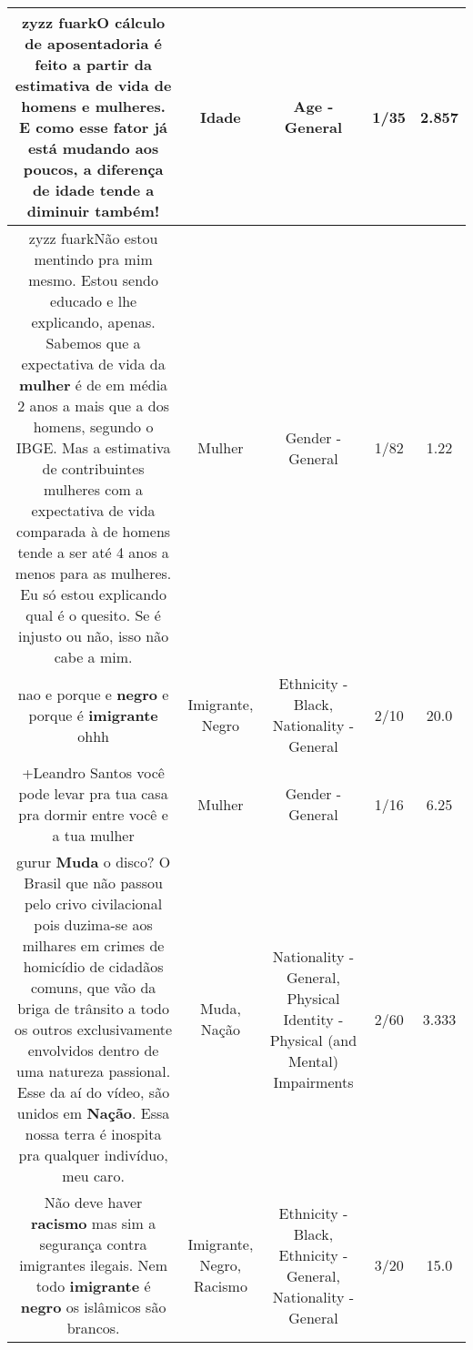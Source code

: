 \documentclass[11pt]{article}
\newlength\mylength
\begin{document}
\begin{center}
\begin{longtable}{|C{.65\mylength}|C{.30\mylength}|C{.12\mylength}|C{.12\mylength}|C{.12\mylength}|}
  \small zyzz fuarkO cálculo de aposentadoria é feito a partir da estimativa de vida de homens e mulheres. E como esse fator já está mudando aos poucos, a diferença de \textbf{idade} tende a diminuir também!\normalsize   & Idade & Age - General & 1/35 & 2.857 \\  \hline
  \small zyzz fuarkNão estou mentindo pra mim mesmo. Estou sendo educado e lhe explicando, apenas. Sabemos que a expectativa de vida da \textbf{mulher} é de em média 2 anos a mais que a dos homens, segundo o IBGE. Mas a estimativa de contribuintes mulheres com a expectativa de vida comparada à de homens tende a ser até 4 anos a menos para as mulheres. Eu só estou explicando qual é o quesito. Se é injusto ou não, isso não cabe a mim.\normalsize   & Mulher & Gender - General & 1/82 & 1.22 \\  \hline
  \small nao e porque e \textbf{negro} e porque é \textbf{imigrante} ohhh\normalsize   & Imigrante, Negro & Ethnicity - Black, Nationality - General & 2/10 & 20.0 \\  \hline
  \small +Leandro Santos você pode levar pra tua casa pra dormir entre você e a tua mulher\normalsize   & Mulher & Gender - General & 1/16 & 6.25 \\  \hline
  \small {} gurur​ \textbf{Muda} o disco? O Brasil que não passou pelo crivo civilacional pois duzima-se aos milhares em crimes de homicídio de cidadãos comuns, que vão da briga de trânsito a todo os outros exclusivamente envolvidos dentro de uma natureza passional. Esse da aí do vídeo,  são unidos em \textbf{Nação}. Essa nossa terra é inospita pra qualquer indivíduo, meu caro.\normalsize   & Muda, Nação & Nationality - General, Physical Identity - Physical (and Mental) Impairments & 2/60 & 3.333 \\  \hline
  \small Não  deve haver \textbf{racismo}  mas sim a segurança  contra  imigrantes  ilegais. Nem todo \textbf{imigrante}  é  \textbf{negro} os islâmicos  são  brancos.\normalsize   & Imigrante, Negro, Racismo & Ethnicity - Black, Ethnicity - General, Nationality - General & 3/20 & 15.0 \\  \hline

\end{longtable}
\end{center}
\end{document}

